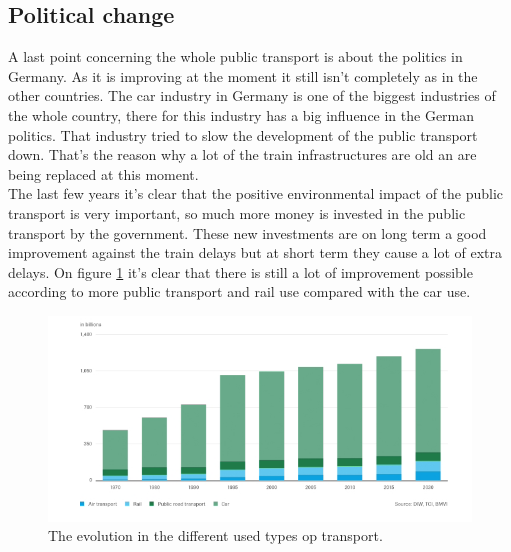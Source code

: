 \subsection{Political change}\label{politicalChange}
A last point concerning the whole public transport is about the politics in Germany. As it is improving at the moment it still isn't completely as in the other countries. The car industry in Germany is one of the biggest industries of the whole country, there for this industry has a big influence in the German politics. That industry tried to slow the development of the public transport down. That's the reason why a lot of the train infrastructures are old an are being replaced at this moment. \\ \newline 
The last few years it's clear that the positive environmental impact of the public transport is very important, so much more money is invested in the public transport by the government. These new investments are on long term a good improvement against the train delays but at short term they cause a lot of extra delays. On figure \ref{fig:typesOfTransport} it's clear that there is still a lot of improvement possible according to more public transport and rail use compared with the car use. 

\begin{figure}[h!]
	\centering
	\includegraphics[width=0.55\textheight]{ProblemsFigures/typesOfTransportGermany}
	\caption{The evolution in the different used types op transport.}
	\label{fig:typesOfTransport}
	
\end{figure}

